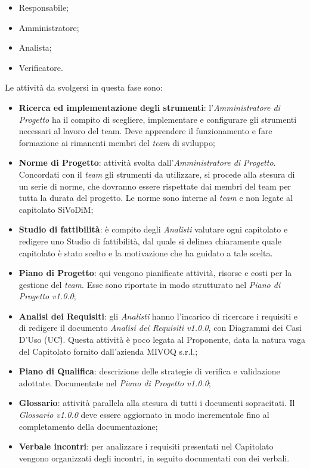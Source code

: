\begin{itemize}
	\item Responsabile;
	\item Amministratore;
	\item Analista;
	\item Verificatore.
\end{itemize}
Le attività da svolgersi in questa fase sono:
\begin{itemize}
	\item \textbf{Ricerca ed implementazione degli strumenti}: 
	l'\textit{Amministratore di Progetto} ha il compito di scegliere, 
	implementare e configurare gli strumenti necessari al lavoro del team. Deve 
	apprendere il funzionamento e fare formazione ai rimanenti membri del 
	\textit{team} di sviluppo;
	\item \textbf{Norme di Progetto}: attività svolta 
	dall'\textit{Amministratore di 
	Progetto}. Concordati con il \textit{team} gli strumenti da utilizzare, 
	si procede 	alla stesura di un serie di norme, che dovranno essere 
	rispettate dai membri del team per tutta la durata del progetto. Le norme 
	sono interne al \textit{team} e non legate al capitolato SiVoDiM;
	\item \textbf{Studio di fattibilità}: è compito degli \textit{Analisti} 
	valutare ogni capitolato e redigere uno Studio di fattibilità, dal quale si 
	delinea chiaramente quale capitolato è stato scelto e la motivazione che ha 
	guidato a tale scelta.
	\item \textbf{Piano di Progetto}: qui vengono pianificate attività, 
	risorse e costi per la gestione del \textit{team}. Esse sono riportate in modo 
	strutturato nel \textit{Piano di Progetto v1.0.0};
	\item \textbf{Analisi dei Requisiti}: gli \textit{Analisti} hanno 
	l'incarico di ricercare i requisiti e di redigere il documento 
	\textit{Analisi dei Requisiti v1.0.0}, con Diagrammi dei Casi D'Uso (UC\G). 
	Questa attività è poco legata	al Proponente, data la natura vaga del 
	Capitolato fornito dall'azienda MIVOQ s.r.l.;
	\item \textbf{Piano di Qualifica}: descrizione delle strategie di verifica e 
	validazione adottate. Documentate nel \textit{Piano di Progetto v1.0.0};
	\item \textbf{Glossario}: attività parallela alla stesura di tutti i 
	documenti sopracitati. Il \textit{Glossario v1.0.0} deve essere aggiornato in 
	modo incrementale fino al completamento della documentazione;
	\item \textbf{Verbale incontri}: per analizzare i requisiti presentati nel 
	Capitolato vengono organizzati degli incontri, in seguito documentati con dei 
	verbali.
\end{itemize}

